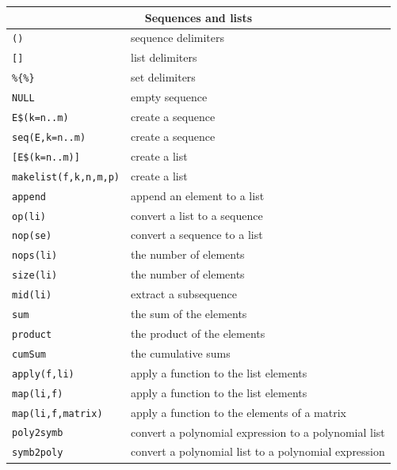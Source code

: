 \documentclass{article}
\begin{document}
\begin{center}
\begin{tabular}{|p{}|p{}|}
\hline
\multicolumn{2}{|c|}{\textbf{Sequences and lists}}\\
\hline\hline
\texttt{(\quad)} & sequence delimiters\\
\texttt{[\quad]} & list delimiters\\
\texttt{\%\{\quad\%\}} & set delimiters\\
\texttt{NULL} & empty sequence\\
\texttt{E\$(k=n..m)} & create a sequence\\
\texttt{seq(E,k=n..m)} & create a sequence\\
\texttt{[E\$(k=n..m)]} & create a list\\
\texttt{makelist(f,k,n,m,p)} & create a list\\
\texttt{append} & append an element to a list\\
\texttt{op(li)} & convert a list to a sequence\\
\texttt{nop(se)} & convert a sequence to a list\\
\texttt{nops(li)} & the number of elements\\
\texttt{size(li)} & the number of elements\\
\texttt{mid(li)} & extract a subsequence\\
\texttt{sum} & the sum of the  elements\\
\texttt{product} & the product of the elements\\
\texttt{cumSum} & the cumulative sums\\
\texttt{apply(f,li)} & apply a function to the list elements\\
\texttt{map(li,f)} & apply a function to the list elements\\
\texttt{map(li,f,matrix)} & apply a function to the elements of a matrix\\
\texttt{poly2symb} & convert a polynomial expression to a polynomial
list\\
\texttt{symb2poly} & convert a polynomial list to a polynomial
expression\\
\hline
\end{tabular}
\end{center}
\end{document}
